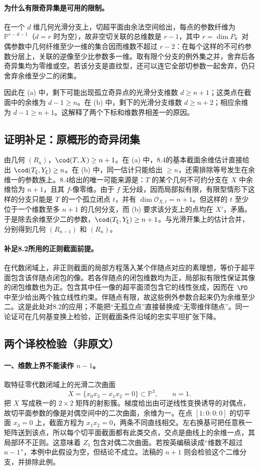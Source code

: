 \documentclass[UTF8,a4paper]{ctexbook}
\begin{document}
\paragraph{为什么有限奇异集是可用的限制。}
在一个 $d$ 维几何光滑分支上，切超平面由余法空间给出，每点的参数纤维为 $\mathbb P^{r-d-1}$（$d=r$ 时为空），故非空切关联的总维数是 $r-1$，其中 $r=\dim P$。对偶参数中几何纤维至少一维的集合因而维数不超过 $r-2$：在每个这样的不可约参数分层上，关联的逆像至少比参数多一维。取有限个分支的例外集之并，舍弃后各奇异集均为零维或空。若该分支是直纹型，还可以连它全部切参数一起舍弃，仍只舍弃余维至少二的闭集。

因此在 (a) 中，剩下可能出现孤立奇异点的光滑分支维数 $d\ge n+1$；这类点在截面中的余维为 $d-1\ge n$。在 (b) 中，剩下的光滑分支维数 $d\ge n+2$；相应余维为 $d-1\ge n+1$。这解释了两个下标和维数界相差一的原因。


\subsection*{证明补足：原概形的奇异闭集}
由几何 $(R_n)$，$\cod(T,X)\ge n+1$。在 (a) 中，8.4的基本截面余维估计直接给出 $\cod(T_\xi,Y_\xi)\ge n$。在 (b) 中，同一估计只能给出 $\ge n$，还需排除等号发生在余维一的参数族上。8.4给出的唯一可能来源是：$T$ 的某个几何不可约分支在 $X$ 中余维恰为 $n+1$，且其 $f$-像零维。由于 $f$ 无分歧，因而局部拟有限，有限型情形下这样的分支只能是 $T$ 的一个孤立闭点 $t$，并有 $\dim\mathcal O_{X,t}=n+1$。但这样的 $t$ 至少位于一个维数至多 $n+1$ 的几何分支，而 (b) 要求该分支上的点均在 $X'$，矛盾。于是除去余维至少二的参数，$\cod(T_\xi,Y_\xi)\ge n+1$。与光滑开集上的估计合并，分别得到几何 $(R_{n-1})$ 和 $(R_n)$。

\paragraph{补足8.2所用的正则截面前提。}
在代数闭域上，非正则截面的局部方程落入某个伴随点对应的素理想，等价于超平面包含该伴随点闭包的像。若各伴随点的闭包维数均为正，局部拟有限性保证其像的闭包维数也为正。包含其中任一像的超平面须包含它的线性张成，因而在 $\PD$ 中至少给出两个独立线性约束。伴随点有限，故这些例外参数合起来仍为余维至少二。这是此处对8.2的应用；不能把“无孤立点”直接替换成“无零维伴随点”。同一论证可在几何基变换上检验，正则截面条件沿域的忠实平坦扩张下降。

\subsection*{两个译校检验（非原文）}
\paragraph{一、维数上界不能读作 $n-1$。}
取特征零代数闭域上的光滑二次曲面
\[
 X=\{x_0x_3-x_1x_2=0\}\subset\mathbb P^3,\qquad n=1.
\]
把 $X$ 写成秩一的 $2\times2$ 矩阵的射影簇。梯度给出由可逆线性变换诱导的对偶点，故切平面参数的像是对偶空间中的二次曲面，余维为一。在点 $[1:0:0:0]$ 的切平面 $x_3=0$ 上，截面方程为 $x_1x_2=0$，两条不同直线相交。左右换基可把任意秩一矩阵送到该点，所以每个切平面截面都有此类交点，交点是曲线上的余维一点，其局部环不正则。这意味着 $Z_1$ 包含对偶二次曲面。若按英编稿读成“维数不超过 $n-1$”，本例中此假设为空，但结论不成立。法稿的 $n+1$ 则会检验这个二维分支，并排除此例。
\end{document}
